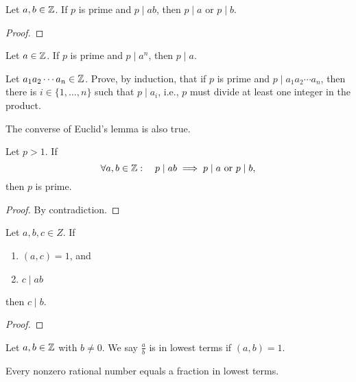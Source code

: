 \documentclass[11pt,a4paper]{article}
\begin{document}
\begin{teo}
    Let \(a,b\in \mathbb{Z}\).
    If \(p\) is prime and \(p\mid ab\), then \(p\mid a\) or \(p\mid b\).
\end{teo}

\begin{proof}
    
\end{proof}

\begin{cor}
    Let \(a\in \mathbb{Z}\).
    If \(p\) is  prime and  \(p\mid a^n\), then \(p\mid a\).
\end{cor}

\begin{eje}
    Let \(a_1 a_2 \cdots a_n\in \mathbb{Z}\).
    Prove, by induction, that if \(p\) is prime and \(p\mid a_1 a_2 \cdots a_n\), then there is \(i\in \{1,\ldots,n\}\) such that \(p\mid a_i\), i.e., \(p\) must divide at least one integer in the product.
\end{eje}

The converse of Euclid's lemma is also true.

\begin{prop}
    Let \(p>1\).
    If 
    \[\forall a,b\in \mathbb{Z}  :\quad p\mid ab\implies p\mid a \text{  or  } p\mid b,\]
    then \(p\) is prime.
\end{prop}

\begin{proof}
    By contradiction.
\end{proof}


\begin{prop}
    Let \(a,b,c\in Z\).
    If 
    \begin{enumerate}[label=(\roman*)]
        \item \((a,c) = 1\), and
        \item \(c\mid ab\)
    \end{enumerate}
    then \(c\mid b\).
\end{prop}


\begin{proof}
    
\end{proof}



\begin{defi}
    Let \(a,b\in \mathbb{Z}\) with \(b\neq 0\). We say \(\frac{a}{b}    \) is in lowest terms if \((a,b) = 1\).
\end{defi}

\begin{lem}
    Every nonzero rational number equals a fraction in lowest terms.
\end{lem}
\end{document}
